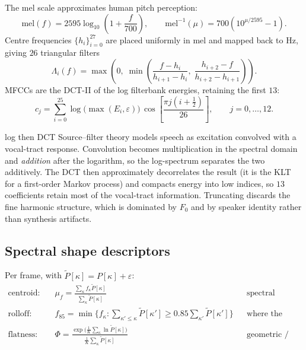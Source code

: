 \documentclass[11pt,a4paper]{article}
\begin{document}
The mel scale approximates human pitch perception:
\begin{equation}
\mathrm{mel}(f) = 2595 \log_{10}\!\left(1 + \frac{f}{700}\right),
\qquad
\mathrm{mel}^{-1}(\mu) = 700\left(10^{\mu/2595} - 1\right).
\end{equation}
Centre frequencies $\{h_i\}_{i=0}^{27}$ are placed uniformly in mel and mapped back to
Hz, giving $26$ triangular filters
\begin{equation}
\Lambda_i(f) = \max\!\left(0,\; \min\!\left(\frac{f-h_i}{h_{i+1}-h_i},\;
\frac{h_{i+2}-f}{h_{i+2}-h_{i+1}}\right)\right).
\end{equation}
MFCCs are the DCT-II of the log filterbank energies, retaining the first $13$:
\begin{equation}
c_j = \sum_{i=0}^{25} \log\!\big(\max(E_i,\varepsilon)\big)\,
\cos\!\left[\frac{\pi j (i + \tfrac12)}{26}\right], \qquad j = 0,\ldots,12 .
\end{equation}

\begin{whybox}{log then DCT}
Source--filter theory models speech as excitation convolved with a vocal-tract
response. Convolution becomes multiplication in the spectral domain and \emph{addition}
after the logarithm, so the log-spectrum separates the two additively. The DCT then
approximately decorrelates the result (it is the KLT for a first-order Markov process)
and compacts energy into low indices, so $13$ coefficients retain most of the
vocal-tract information. Truncating discards the fine harmonic structure, which is
dominated by $F_0$ and by speaker identity rather than synthesis artifacts.
\end{whybox}

\subsection{Spectral shape descriptors}

Per frame, with $\tilde P[\kappa] = P[\kappa] + \varepsilon$:
\begin{align}
\text{centroid:}\quad & \mu_f = \frac{\sum_\kappa f_\kappa \tilde P[\kappa]}{\sum_\kappa \tilde P[\kappa]}
&& \text{spectral ``centre of mass''}\\[2pt]
\text{rolloff:}\quad & f_{85} = \min\Big\{ f_\kappa : \textstyle\sum_{\kappa' \le \kappa} \tilde P[\kappa'] \ge 0.85 \sum_{\kappa'} \tilde P[\kappa'] \Big\}
&& \text{where the energy ends}\\[2pt]
\text{flatness:}\quad & \Phi = \frac{\exp\!\big(\frac{1}{K}\sum_\kappa \ln \tilde P[\kappa]\big)}{\frac{1}{K}\sum_\kappa \tilde P[\kappa]}
&& \text{geometric / arithmetic mean}
\end{align}
\end{document}
